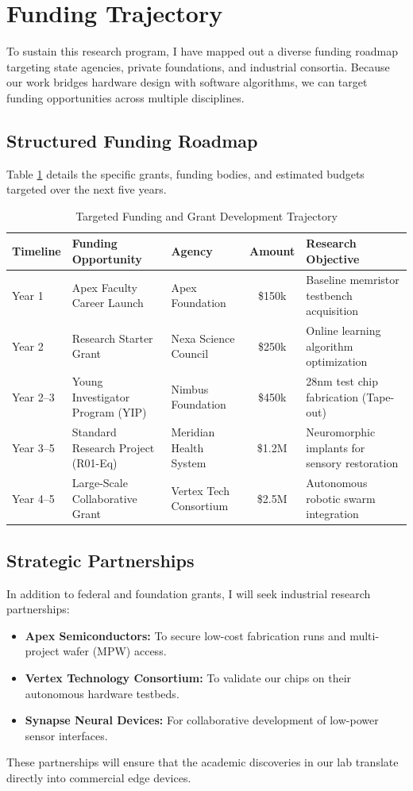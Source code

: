 \section{Funding Trajectory}

To sustain this research program, I have mapped out a diverse funding roadmap targeting state agencies, private foundations, and industrial consortia. Because our work bridges hardware design with software algorithms, we can target funding opportunities across multiple disciplines.

\subsection{Structured Funding Roadmap}
Table \ref{tab:funding_roadmap} details the specific grants, funding bodies, and estimated budgets targeted over the next five years.

\begin{table}[htbp]
\centering
\caption{Targeted Funding and Grant Development Trajectory}
\label{tab:funding_roadmap}
\begin{tabularx}{\textwidth}{l >{\raggedright\arraybackslash}p{4.2cm} l c >{\raggedright\arraybackslash}X}
\toprule
\textbf{Timeline} & \textbf{Funding Opportunity} & \textbf{Agency} & \textbf{Amount} & \textbf{Research Objective} \\
\midrule
Year 1 & Apex Faculty Career Launch & Apex Foundation & \$150k & Baseline memristor testbench acquisition \\
Year 2 & Research Starter Grant & Nexa Science Council & \$250k & Online learning algorithm optimization \\
Year 2--3 & Young Investigator Program (YIP) & Nimbus Foundation & \$450k & 28nm test chip fabrication (Tape-out) \\
Year 3--5 & Standard Research Project (R01-Eq) & Meridian Health System & \$1.2M & Neuromorphic implants for sensory restoration \\
Year 4--5 & Large-Scale Collaborative Grant & Vertex Tech Consortium & \$2.5M & Autonomous robotic swarm integration \\
\bottomrule
\end{tabularx}
\end{table}

\subsection{Strategic Partnerships}
In addition to federal and foundation grants, I will seek industrial research partnerships:
\begin{itemize}
    \item \textbf{Apex Semiconductors:} To secure low-cost fabrication runs and multi-project wafer (MPW) access.
    \item \textbf{Vertex Technology Consortium:} To validate our chips on their autonomous hardware testbeds.
    \item \textbf{Synapse Neural Devices:} For collaborative development of low-power sensor interfaces.
\end{itemize}
These partnerships will ensure that the academic discoveries in our lab translate directly into commercial edge devices.
